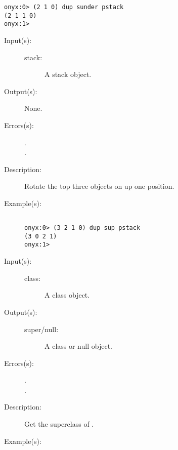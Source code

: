 \begin{description}
\begin{description}
\begin{verbatim}
onyx:0> (2 1 0) dup sunder pstack
(2 1 1 0)
onyx:1>
		\end{verbatim}
	\end{description}
\label{systemdict:sup}
\item[{\onyxop{stack}{sup}{--}}: ]
	\begin{description}\item[]
	\item[Input(s): ]
		\begin{description}\item[]
		\item[stack: ]
			A stack object.
		\end{description}
	\item[Output(s): ] None.
	\item[Errors(s): ]
		\begin{description}\item[]
		\item[.]
		\item[.]
		\end{description}
	\item[Description: ]
		Rotate the top three objects on  up one position.
	\item[Example(s): ]\begin{verbatim}

onyx:0> (3 2 1 0) dup sup pstack
(3 0 2 1)
onyx:1>
		\end{verbatim}
	\end{description}
\label{systemdict:super}
\item[{\onyxop{class}{super}{super/null}}: ]
	\begin{description}\item[]
	\item[Input(s): ]
		\begin{description}\item[]
		\item[class: ]
			A class object.
		\end{description}
	\item[Output(s): ]
		\begin{description}\item[]
		\item[super/null: ]
			A class or null object.
		\end{description}
	\item[Errors(s): ]
		\begin{description}\item[]
		\item[.]
		\item[.]
		\end{description}
	\item[Description: ]
		Get the superclass of .
	\item[Example(s): ]\begin{verbatim}


\end{verbatim}
\end{description}
\end{description}
